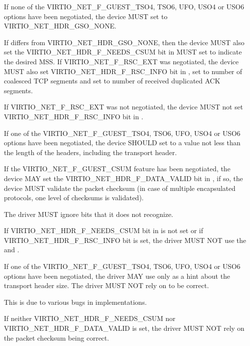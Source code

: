 If none of the VIRTIO_NET_F_GUEST_TSO4, TSO6, UFO, USO4 or USO6 options have
been negotiated, the device MUST set  to
VIRTIO_NET_HDR_GSO_NONE.

If  differs from VIRTIO_NET_HDR_GSO_NONE, then
the device MUST also set the VIRTIO_NET_HDR_F_NEEDS_CSUM bit in
 MUST set  to indicate the desired MSS.
If VIRTIO_NET_F_RSC_EXT was negotiated, the device MUST also
set VIRTIO_NET_HDR_F_RSC_INFO bit in ,
set  to number of coalesced TCP segments and
set  to number of received duplicated ACK segments.

If VIRTIO_NET_F_RSC_EXT was not negotiated, the device MUST
not set VIRTIO_NET_HDR_F_RSC_INFO bit in .

If one of the VIRTIO_NET_F_GUEST_TSO4, TSO6, UFO, USO4 or USO6 options have
been negotiated, the device SHOULD set  to a value
not less than the length of the headers, including the transport
header.

If the VIRTIO_NET_F_GUEST_CSUM feature has been negotiated, the
device MAY set the VIRTIO_NET_HDR_F_DATA_VALID bit in
, if so, the device MUST validate the packet
checksum (in case of multiple encapsulated protocols, one level
of checksums is validated).


The driver MUST ignore  bits that it does not recognize.

If VIRTIO_NET_HDR_F_NEEDS_CSUM bit in  is not set or
if VIRTIO_NET_HDR_F_RSC_INFO bit  is set, the
driver MUST NOT use the  and .

If one of the VIRTIO_NET_F_GUEST_TSO4, TSO6, UFO, USO4 or USO6 options have
been negotiated, the driver MAY use  only as a hint about the
transport header size.
The driver MUST NOT rely on  to be correct.
\begin{note}
This is due to various bugs in implementations.
\end{note}

If neither VIRTIO_NET_HDR_F_NEEDS_CSUM nor
VIRTIO_NET_HDR_F_DATA_VALID is set, the driver MUST NOT
rely on the packet checksum being correct.

